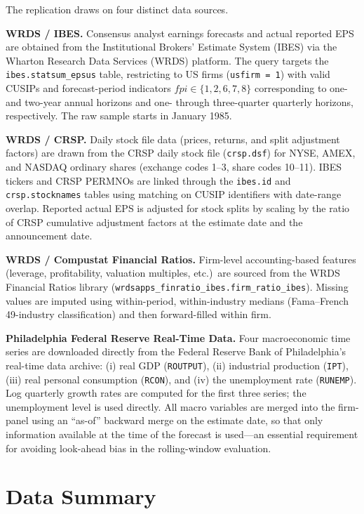 \documentclass[12pt]{article}
\begin{document}
The replication draws on four distinct data sources.

\textbf{WRDS / IBES.}  Consensus analyst earnings forecasts and actual
reported EPS are obtained from the Institutional Brokers' Estimate System
(IBES) via the Wharton Research Data Services (WRDS) platform.  The query
targets the \texttt{ibes.statsum\_epsus} table, restricting to US firms
(\texttt{usfirm = 1}) with valid CUSIPs and forecast-period indicators
$\mathit{fpi} \in \{1, 2, 6, 7, 8\}$ corresponding to one- and two-year
annual horizons and one- through three-quarter quarterly horizons,
respectively.  The raw sample starts in January 1985.

\textbf{WRDS / CRSP.}  Daily stock file data (prices, returns, and split
adjustment factors) are drawn from the CRSP daily stock file
(\texttt{crsp.dsf}) for NYSE, AMEX, and NASDAQ ordinary shares (exchange
codes 1--3, share codes 10--11).  IBES tickers and CRSP PERMNOs are linked
through the \texttt{ibes.id} and \texttt{crsp.stocknames} tables using
matching on CUSIP identifiers with date-range overlap.  Reported actual EPS
is adjusted for stock splits by scaling by the ratio of CRSP cumulative
adjustment factors at the estimate date and the announcement date.

\textbf{WRDS / Compustat Financial Ratios.}  Firm-level accounting-based
features (leverage, profitability, valuation multiples, etc.)\ are sourced
from the WRDS Financial Ratios library
(\texttt{wrdsapps\_finratio\_ibes.firm\_ratio\_ibes}).  Missing values are
imputed using within-period, within-industry medians (Fama--French 49-industry
classification) and then forward-filled within firm.

\textbf{Philadelphia Federal Reserve Real-Time Data.}  Four macroeconomic
time series are downloaded directly from the Federal Reserve Bank of
Philadelphia's real-time data archive: (i) real GDP (\texttt{ROUTPUT}),
(ii) industrial production (\texttt{IPT}), (iii) real personal consumption
(\texttt{RCON}), and (iv) the unemployment rate (\texttt{RUNEMP}).  Log
quarterly growth rates are computed for the first three series; the
unemployment level is used directly.  All macro variables are merged into
the firm-panel using an ``as-of'' backward merge on the estimate date, so
that only information available at the time of the forecast is used---an
essential requirement for avoiding look-ahead bias in the rolling-window
evaluation.

\section{Data Summary}
\end{document}
